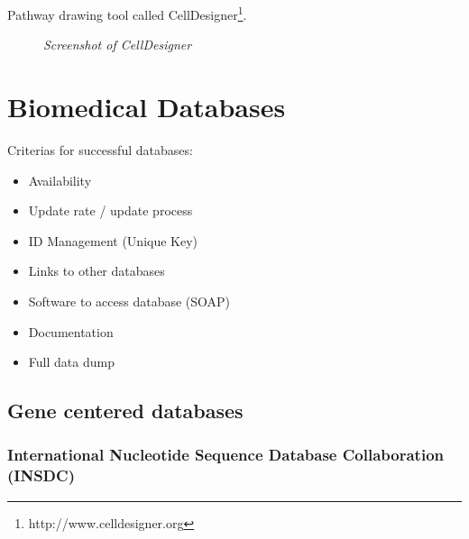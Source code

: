 Pathway drawing tool called CellDesigner\footnote{http://www.celldesigner.org}.

\begin{figure}[ht]
\centering
{} 
\caption[Screenshot of CellDesigner]{\textit{Screenshot of CellDesigner}} 
\label{gfx:screenshot_cell_designer}
\end{figure}

\section{Biomedical Databases}

Criterias for successful databases: 
\begin{itemize}
 \item Availability
 \item Update rate / update process
 \item ID Management (Unique Key)
 \item Links to other databases
 \item Software to access database (SOAP)
 \item Documentation
 \item Full data dump 
\end{itemize}

\subsection{Gene centered databases}

\subsubsection{International Nucleotide Sequence Database Collaboration (INSDC)}

